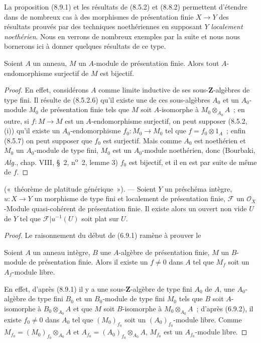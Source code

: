 \begin{env}[8.9.2]
\label{IV.8.9.2-fr}
La proposition (8.9.1) et les résultats de (8.5.2) et (8.8.2) permettent
d'étendre dans de nombreux cas à des morphismes de présentation finie
$X\to Y$ des résultats prouvés par des techniques noethériennes en supposant
$Y$ \emph{localement noethérien}.
Nous en verrons de nombreux exemples par la suite et nous nous bornerons ici
à donner quelques résultats de ce type.
\end{env}

\begin{proposition}[8.9.3]
\label{IV.8.9.3-fr}
Soient $A$ un anneau, $M$ un $A$-module de présentation finie. Alors tout
$A$-endomorphisme surjectif de $M$ est bijectif.
\end{proposition}

\begin{proof}
En effet, considérons $A$ comme limite inductive de ses sous-$\mathbf Z$-algèbres
de type fini. Il résulte de (8.5.2.6) qu'il existe une de ces sous-algèbres
$A_0$ et un $A_0$-module $M_0$ de présentation finie tels que $M$ soit
$A$-isomorphe à $M_0\otimes_{A_0}A$~; en outre, si $f:M\to M$ est un
$A$-endomorphisme surjectif, on peut supposer (8.5.2, (i)) qu'il existe un
$A_0$-endomorphisme $f_0:M_0\to M_0$ tel que $f=f_0\otimes1_A$~; enfin
(8.5.7) on peut supposer que $f_0$ est surjectif. Mais comme $A_0$ est
noethérien et $M_0$ un $A_0$-module de type fini, $M_0$ est un $A_0$-module
noethérien, donc (Bourbaki, \emph{Alg.}, chap. VIII, \S~2, n\textsuperscript{o}~2,
lemme 3) $f_0$ est bijectif, et il en est par suite de même de $f$.
\end{proof}

\begin{proposition}[8.9.4]
\label{IV.8.9.4-fr}
(«~théorème de platitude générique~»). --- Soient $Y$ un préschéma intègre,
$u:X\to Y$ un morphisme de type fini et localement de présentation finie,
$\mathcal F$ un $\mathcal O_X$-Module quasi-cohérent de présentation finie. Il
existe alors un ouvert non vide $U$ de $Y$ tel que
$\mathcal F|u^{-1}(U)$ soit plat sur $U$.
\end{proposition}

\begin{proof}
Le raisonnement du début de (6.9.1) ramène à prouver le

\begin{lemma}[8.9.4.1]
\label{IV.8.9.4.1-fr}
Soient $A$ un anneau intègre, $B$ une $A$-algèbre de présentation finie,
$M$ un $B$-module de présentation finie. Alors il existe un $f\neq0$ dans
$A$ tel que $M_f$ soit un $A_f$-module libre.
\end{lemma}

En effet, d'après (8.9.1) il y a une sous-$\mathbf Z$-algèbre de type fini
$A_0$ de $A$, une $A_0$-algèbre de type fini $B_0$ et un $B_0$-module de type
fini $M_0$ tels que $B$ soit $A$-isomorphe à $B_0\otimes_{A_0}A$ et que $M$
soit $B$-isomorphe à $M_0\otimes_{A_0}A$~; d'après (6.9.2), il existe
$f_0\neq0$ dans $A_0$ tel que $(M_0)_{f_0}$ soit un
$(A_0)_{f_0}$-module libre. Comme
$M_{f_0}=(M_0)_{f_0}\otimes_{A_0}A$ et
$A_{f_0}=(A_0)_{f_0}\otimes_{A_0}A$, $M_{f_0}$ est un $A_{f_0}$-module libre.
\end{proof}

